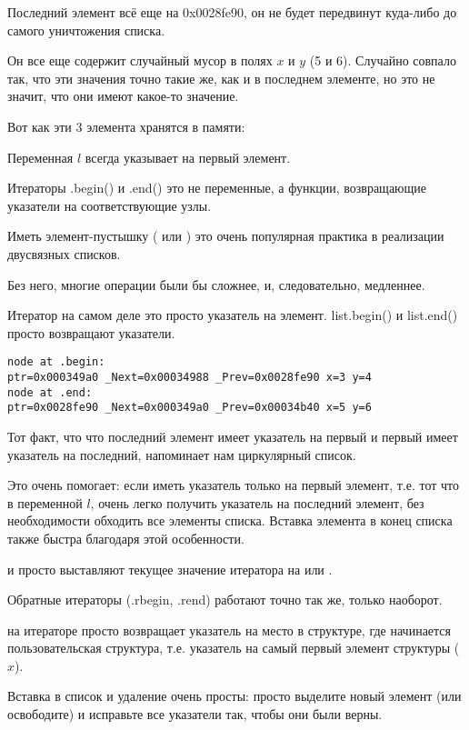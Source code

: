 Последний элемент всё еще на 0x0028fe90, 
он не будет передвинут куда-либо до самого уничтожения списка.

Он все еще содержит случайный мусор в полях $x$ и $y$ (5 и 6). 
Случайно совпало так, что эти значения точно такие же, как и в последнем элементе, но это не значит,
что они имеют какое-то значение.

Вот как эти 3 элемента хранятся в памяти:



Переменная $l$ всегда указывает на первый элемент.

Итераторы .begin() и .end() это не переменные, а функции,
возвращающие указатели на соответствующие узлы.

Иметь элемент-пустышку ( или ) это очень популярная практика в реализации двусвязных списков.%

Без него, многие операции были бы сложнее, и, следовательно, медленнее.

Итератор на самом деле это просто указатель на элемент.
list.begin() и list.end() просто возвращают указатели.

\begin{lstlisting}
node at .begin:
ptr=0x000349a0 _Next=0x00034988 _Prev=0x0028fe90 x=3 y=4
node at .end:
ptr=0x0028fe90 _Next=0x000349a0 _Prev=0x00034b40 x=5 y=6
\end{lstlisting}

Тот факт, что что последний элемент имеет указатель на первый 
и первый имеет указатель на последний, напоминает нам циркулярный список.

Это очень помогает: если иметь указатель только на первый элемент, т.е.
тот что в переменной $l$, очень легко получить указатель на последний элемент, без необходимости
обходить все элементы списка.
Вставка элемента в конец списка также быстра благодаря этой особенности.

 и  просто выставляют текущее значение итератора на  или .

Обратные итераторы (.rbegin, .rend) работают точно так же, только наоборот.

 на итераторе просто возвращает указатель на место в структуре, где начинается пользовательская
структура, т.е. указатель на самый первый элемент структуры ($x$).

Вставка в список и удаление очень просты: просто выделите новый элемент (или освободите) и исправьте
все указатели так, чтобы они были верны.

